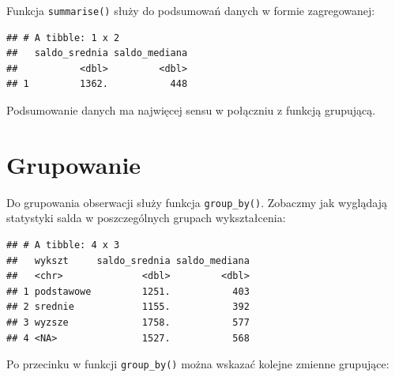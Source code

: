 \documentclass[]{book}
\newenvironment{Shaded}{\begin{snugshade}}{\end{snugshade}}
\newcommand{\KeywordTok}[1]{\textcolor[rgb]{0.13,0.29,0.53}{\textbf{#1}}}
\newcommand{\DataTypeTok}[1]{\textcolor[rgb]{0.13,0.29,0.53}{#1}}
\newcommand{\StringTok}[1]{\textcolor[rgb]{0.31,0.60,0.02}{#1}}
\newcommand{\OperatorTok}[1]{\textcolor[rgb]{0.81,0.36,0.00}{\textbf{#1}}}
\newcommand{\NormalTok}[1]{#1}
\begin{document}
Funkcja \texttt{summarise()} służy do podsumowań danych w formie
zagregowanej:

\begin{Shaded}
\end{Shaded}

\begin{verbatim}
## # A tibble: 1 x 2
##   saldo_srednia saldo_mediana
##           <dbl>         <dbl>
## 1         1362.           448
\end{verbatim}

Podsumowanie danych ma najwięcej sensu w połączniu z funkcją grupującą.

\section{Grupowanie}\label{grupowanie}

Do grupowania obserwacji służy funkcja \texttt{group\_by()}. Zobaczmy
jak wyglądają statystyki salda w poszczególnych grupach wykształcenia:

\begin{Shaded}
\end{Shaded}

\begin{verbatim}
## # A tibble: 4 x 3
##   wykszt     saldo_srednia saldo_mediana
##   <chr>              <dbl>         <dbl>
## 1 podstawowe         1251.           403
## 2 srednie            1155.           392
## 3 wyzsze             1758.           577
## 4 <NA>               1527.           568
\end{verbatim}

Po przecinku w funkcji \texttt{group\_by()} można wskazać kolejne
zmienne grupujące:

\begin{Shaded}
\end{Shaded}
\end{document}
